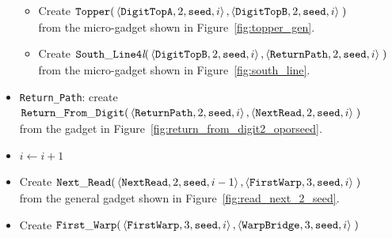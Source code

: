 \begin{itemize}
\begin{itemize}
        \item Create
        $\begin{aligned}[t]
            {\tt Topper}(& \left \langle {\tt DigitTopA}, 2, {\tt seed}, i \right\rangle,
                           \left \langle {\tt DigitTopB}, 2, {\tt seed}, i \right\rangle \;)
        \end{aligned}$\\ from the micro-gadget shown in Figure~\ref{fig:topper_gen}.

        \item Create
        $\begin{aligned}[t]
            {\tt South\_Line4\textit{l}}(&\left\langle {\tt DigitTopB}, 2, {\tt seed}, i \right\rangle,
                                          \left\langle {\tt ReturnPath},     2, {\tt seed}, i \right\rangle \;)
        \end{aligned}$\\ from the micro-gadget shown in Figure~\ref{fig:south_line}.
    \end{itemize}


    \item {\tt Return\_Path}: create
    $\begin{aligned}[t]
        {\tt Return\_From\_Digit}(&\left\langle {\tt ReturnPath},    2, {\tt seed}, i \right\rangle,
                          \left\langle {\tt NextRead}, 2, {\tt seed}, i \right\rangle \;)
    \end{aligned}$\\ from the gadget in Figure~\ref{fig:return_from_digit2_oporseed}.


    \item $i \gets i + 1$

    \item Create
    $\begin{aligned}[t]
        {\tt Next\_Read}(&\left\langle {\tt NextRead},  2, {\tt seed}, i - 1 \right\rangle,
                   \left\langle {\tt FirstWarp}, 3, {\tt seed}, i     \right\rangle \;)
    \end{aligned}$\\ from the general gadget shown in Figure~\ref{fig:read_next_2_seed}.

    \item Create
    $\begin{aligned}[t]
        {\tt First\_Warp}(&\left\langle {\tt FirstWarp},  3, {\tt seed}, i \right\rangle,
                    \left\langle {\tt WarpBridge}, 3, {\tt seed}, i \right\rangle \;)
    \end{aligned}$


\end{itemize}
